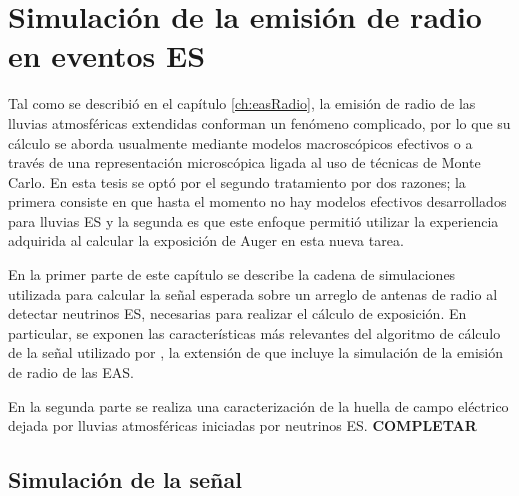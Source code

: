 \chapter{Simulaci\'on de la emisi\'on de radio en eventos ES}
\label{ch:simulacionRadio}

Tal como se describi\'o en el cap\'itulo \ref{ch:easRadio}, la emisi\'on de radio de las lluvias atmosf\'ericas extendidas conforman un fen\'omeno complicado, por lo que su c\'alculo se aborda usualmente mediante modelos macrosc\'opicos efectivos o a trav\'es de una representaci\'on microsc\'opica ligada al uso de t\'ecnicas de Monte Carlo.
En esta tesis se opt\'o por el segundo tratamiento por dos razones; la primera consiste en que hasta el momento no hay modelos efectivos desarrollados para lluvias ES y la segunda es que este enfoque permiti\'o utilizar la experiencia adquirida al calcular la exposici\'on de Auger en esta nueva tarea.

En la primer parte de este cap\'itulo se describe la cadena de simulaciones utilizada para calcular la se\~nal esperada sobre un arreglo de antenas de radio al detectar neutrinos ES, necesarias para realizar el c\'alculo de exposici\'on.
En particular, se exponen las caracter\'isticas m\'as relevantes del algoritmo de c\'alculo de la se\~nal utilizado por \zhs{}, la extensi\'on de \aires{} que incluye la simulaci\'on de la emisi\'on de radio de las EAS.

En la segunda parte se realiza una caracterizaci\'on de la huella de campo el\'ectrico dejada por lluvias atmosf\'ericas iniciadas por neutrinos ES.
\textbf{COMPLETAR}

\section{Simulaci\'on de la se\~nal}
\label{sc:simRadio}
	
